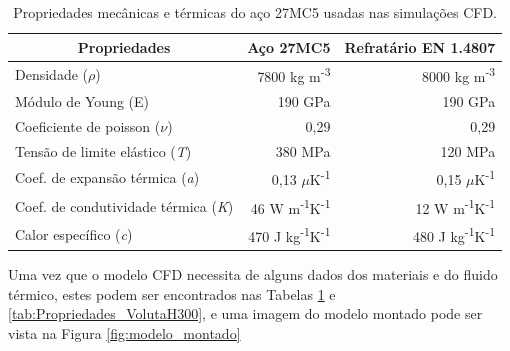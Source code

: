 \begin{table}[htb]
    \centering
    \caption[Propriedades mecânicas e térmicas do aço 27MC5]%
    {Propriedades mecânicas e térmicas do aço 27MC5 usadas nas simulações CFD.}
    \label{tab:Propriedades_27MC5}
    \begin{tabular}{lrr} 
    \toprule
    \multicolumn{1}{c}{\textbf{Propriedades}} & \multicolumn{1}{c}{\textbf{Aço 27MC5}}            & \multicolumn{1}{c}{\textbf{Refratário EN 1.4807}}  \\ 
    \hline\hline
    Densidade ($\rho$)                        & 7800 kg m\textsuperscript{-3}                     & 8000 kg m\textsuperscript{-3}                      \\
    Módulo de Young (E)                       & 190 GPa                                           & 190 GPa                                            \\
    Coeficiente de poisson ($\nu$)            & 0,29                                              & 0,29                                               \\
    Tensão de limite elástico (\textit{T})             & 380 MPa                                           & 120 MPa                                            \\
    Coef. de expansão térmica (\textit{a})             & 0,13 $\mu$K\textsuperscript{-1}                   & 0,15 $\mu$K\textsuperscript{-1}                    \\
    Coef. de condutividade térmica (\textit{K})        & 46 W m\textsuperscript{-1}K\textsuperscript{-1}   & 12 W m\textsuperscript{-1}K\textsuperscript{-1}    \\
    Calor específico (\textit{c})                      & 470 J kg\textsuperscript{-1}K\textsuperscript{-1} & 480 J kg\textsuperscript{-1}K\textsuperscript{-1}  \\
    \toprule
    \end{tabular}
    \end{table}
\newpage
\par
Uma vez que o modelo CFD necessita de alguns dados dos materiais e do fluido térmico, estes podem ser encontrados nas Tabelas \ref{tab:Propriedades_27MC5} e \ref{tab:Propriedades_VolutaH300}, e uma imagem do modelo montado pode ser vista na Figura \ref{fig:modelo_montado}
